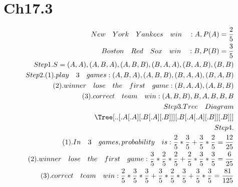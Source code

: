 \documentclass{article}
\begin{document}
\section*{Ch17.3}
\begin{align*}
    New \quad York \quad Yankees \quad win \quad : A,P(A) = \frac{2}{5} \\ 
    \quad Boston \quad Red \quad Sox \quad win \quad : B,P(B) = \frac{3}{5} \\
    Step1. S={(A,A),(A,B,A),(A,B,B),(B,A,A),(B,A,B),(B,B)} \\
    Step2. (1). play \quad 3 \quad games: {(A,B,A),(A,B,B),(B,A,A),(B,A,B)} \\ 
    (2). winner \quad lose \quad the \quad first \quad game: {(B,A,A),(A,B,B)} \\
    (3). correct \quad team \quad win: {(A,B,B),{B,A,B},{B,B}}\\
    Step3. Tree \quad Diagram   \\   
    \Tree 
    [..
    [.A [.A ] [.B [.A ] [.B ] ] ] 
    [.B [.A [.A ] [.B ] ] [.B ] ]
    ]
    \\ 
    Step4. \\ 
    (1). In \quad 3 \quad games, probability \quad is: 
    \frac{2}{5}*\frac{3}{5}+\frac{3}{5}*\frac{2}{5} = \frac{12}{25}\\ 
    (2). winner \quad lose \quad the \quad first \quad game: \frac{3}{5}*\frac{2}{5}*\frac{2}{5} + \frac{2}{5}*\frac{3}{5}*\frac{3}{5} = \frac{6}{25} \\
    (3). correct \quad team \quad win: \frac{2}{5}*\frac{3}{5}*\frac{3}{5} + \frac{3}{5}*\frac{2}{5}*\frac{3}{5}+\frac{3}{5}*\frac{3}{5} = \frac{81}{125}\\
\end{align*}

\clearpage
\end{document}
